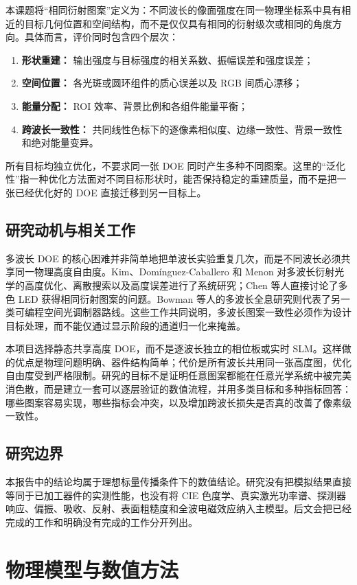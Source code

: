 \documentclass[UTF8,a4paper,12pt]{ctexart}
\begin{document}
本课题将“相同衍射图案”定义为：不同波长的像面强度在同一物理坐标系中具有相近的目标几何位置和空间结构，而不是仅仅具有相同的衍射级次或相同的角度方向。具体而言，评价同时包含四个层次：
\begin{enumerate}
\item \textbf{形状重建：} 输出强度与目标强度的相关系数、振幅误差和强度误差；
\item \textbf{空间位置：} 各光斑或圆环组件的质心误差以及 RGB 间质心漂移；
\item \textbf{能量分配：} ROI 效率、背景比例和各组件能量平衡；
\item \textbf{跨波长一致性：} 共同线性色标下的逐像素相似度、边缘一致性、背景一致性和绝对能量变异。
\end{enumerate}
所有目标均独立优化，不要求同一张 DOE 同时产生多种不同图案。这里的“泛化性”指一种优化方法面对不同目标形状时，能否保持稳定的重建质量，而不是把一张已经优化好的 DOE 直接迁移到另一目标上。

\subsection{研究动机与相关工作}
多波长 DOE 的核心困难并非简单地把单波长实验重复几次，而是不同波长必须共享同一物理高度自由度。Kim、Domínguez-Caballero 和 Menon 对多波长衍射光学的高度优化、离散搜索以及高度误差进行了系统研究\cite{kim2012}；Chen 等人直接讨论了多色 LED 获得相同衍射图案的问题\cite{chen2016}。Bowman 等人的多波长全息研究则代表了另一类可编程空间光调制器路线\cite{bowman2015}。这些工作共同说明，多波长图案一致性必须作为设计目标处理，而不能仅通过显示阶段的通道归一化来掩盖。

本项目选择静态共享高度 DOE，而不是逐波长独立的相位板或实时 SLM。这样做的优点是物理问题明确、器件结构简单；代价是所有波长共用同一张高度图，优化自由度受到严格限制。研究的目标不是证明任意图案都能在任意光学系统中被完美消色散，而是建立一套可以逐层验证的数值流程，并用多类目标和多种指标回答：哪些图案容易实现，哪些指标会冲突，以及增加跨波长损失是否真的改善了像素级一致性。

\subsection{研究边界}
本报告中的结论均属于理想标量传播条件下的数值结论。研究没有把模拟结果直接等同于已加工器件的实测性能，也没有将 CIE 色度学、真实激光功率谱、探测器响应、偏振、吸收、反射、表面粗糙度和全波电磁效应纳入主模型。后文会把已经完成的工作和明确没有完成的工作分开列出。

\section{物理模型与数值方法}
\end{document}
